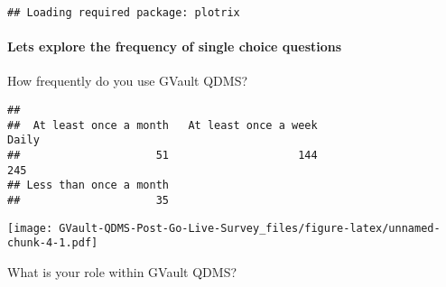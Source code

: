 \documentclass[
]{article}
\newenvironment{Shaded}{\begin{snugshade}}{\end{snugshade}}
\newcommand{\DataTypeTok}[1]{\textcolor[rgb]{0.13,0.29,0.53}{#1}}
\newcommand{\DecValTok}[1]{\textcolor[rgb]{0.00,0.00,0.81}{#1}}
\newcommand{\FloatTok}[1]{\textcolor[rgb]{0.00,0.00,0.81}{#1}}
\newcommand{\KeywordTok}[1]{\textcolor[rgb]{0.13,0.29,0.53}{\textbf{#1}}}
\newcommand{\NormalTok}[1]{#1}
\newcommand{\OperatorTok}[1]{\textcolor[rgb]{0.81,0.36,0.00}{\textbf{#1}}}
\newcommand{\StringTok}[1]{\textcolor[rgb]{0.31,0.60,0.02}{#1}}
\begin{document}
\begin{verbatim}
## Loading required package: plotrix
\end{verbatim}

\hypertarget{lets-explore-the-frequency-of-single-choice-questions}{%
\paragraph{Lets explore the frequency of single choice
questions}\label{lets-explore-the-frequency-of-single-choice-questions}}

How frequently do you use GVault QDMS?

\begin{Shaded}
\end{Shaded}

\begin{verbatim}
## 
##  At least once a month   At least once a week                  Daily 
##                     51                    144                    245 
## Less than once a month 
##                     35
\end{verbatim}

\begin{Shaded}
\end{Shaded}

\texttt{[image: GVault-QDMS-Post-Go-Live-Survey\_files/figure-latex/unnamed-chunk-4-1.pdf]}

What is your role within GVault QDMS?

\begin{Shaded}
\end{Shaded}
\end{document}
